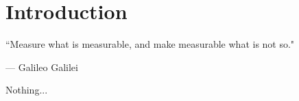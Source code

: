 %
%
%
%


\chapter{Introduction}
	\label{intro_chapter}
	\vspace{-0.2in}

	\begin{quoting}
		\noindent \large ``Measure what is measurable, and make measurable what is not so." \normalsize

		--- Galileo Galilei
	\end{quoting}

	Nothing...


	



